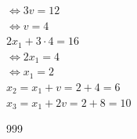 \documentclass[a4paper]{article}
\begin{document}
$\Leftrightarrow 3v = 12$ \\

$\Leftrightarrow v = 4$ \\

$2x_{1} + 3 \cdot 4 = 16$ \\

$\Leftrightarrow 2x_{1} = 4$ \\

$\Leftrightarrow x_{1} = 2$ \\

$ x_{2} = x_{1} + v = 2 + 4 = 6 $ \\

$ x_{3} = x_{1} + 2v = 2 + 8 = 10 $ \\

\begin{thebibliography}{999}
\end{thebibliography}
\end{document}
